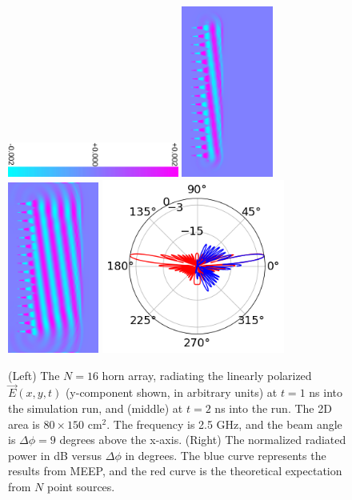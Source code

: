 \documentclass[../../main.tex]{subfiles}
\begin{document}
\begin{figure}[ht]
\centering
\includegraphics[width=5.625cm,angle=90]{figures/fields/colorbar.pdf}
\includegraphics[width=3cm]{figures/fields/ey_phase_horn_t30.png}
\includegraphics[width=3cm]{figures/fields/ey_phase_horn_t60.png}
\includegraphics[width=6cm]{figures/fields/rad_patt_field.png}
\caption{\label{fig:1dhornresults2} (Left) The $N = 16$ horn array, radiating the linearly polarized $\vec{E}(x,y,t)$ (y-component shown, in arbitrary units) at $t = 1$ ns into the simulation run, and (middle) at $t = 2$ ns into the run.  The 2D area is $80 \times 150$ cm$^2$.  The frequency is 2.5 GHz, and the beam angle is $\Delta \phi = 9$ degrees above the x-axis. (Right) The normalized radiated power in dB versus $\Delta \phi$ in degrees.  The blue curve represents the results from MEEP, and the red curve is the theoretical expectation from $N$ point sources.}
\end{figure}
\end{document}

